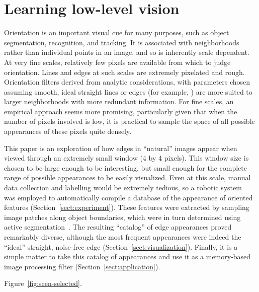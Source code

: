 

\section{Learning low-level vision}

Orientation is an important visual cue for many purposes, such as
object segmentation, recognition, and tracking.  It is associated with
neighborhoods rather than individual points in an image, and so is
inherently scale dependent.  At very fine scales, relatively few
pixels are available from which to judge orientation.
Lines and edges at such scales are extremely pixelated and
rough.
%
Orientation filters derived from analytic considerations, with
parameters chosen assuming smooth, ideal straight lines or edges (for
example, \cite{chen00orientation}) are more suited to larger
neighborhoods with more redundant information.
For fine scales, an empirical approach seems more promising, particularly
given that when the number of pixels involved is low, it is practical
to sample the space of all possible appearances of these pixels 
quite densely.

This paper is an exploration of how edges in ``natural'' images appear
when viewed through an extremely small window (4 by 4 pixels).  This
window size is chosen to be large enough to be interesting, but small
enough for the complete range of possible appearances to be easily
visualized.  Even at this scale, manual data collection and labelling
would be extremely tedious, so a robotic system~\cite{brooks99cog} was employed to
automatically compile a database of the appearance of 
oriented features (Section~\ref{sect:experiment}).
These features were extracted by sampling image patches
along object boundaries, which were in turn determined 
using active segmentation~\cite{fitzpatrick03first}.
The resulting ``catalog'' of edge appearances proved remarkably
diverse, although the most frequent appearances were indeed
the ``ideal'' straight, noise-free edge (Section~\ref{sect:visualization}).
Finally, it is a simple matter to take this catalog
of appearances and use it
as a memory-based image processing filter (Section~\ref{sect:application}).

Figure~\ref{fig:seen-selected}.

